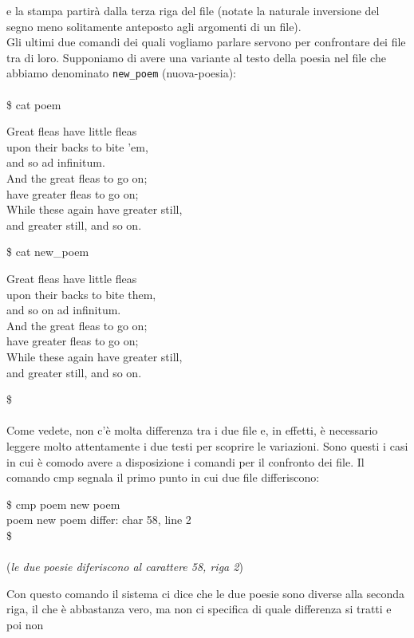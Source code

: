 e la stampa partirà dalla terza riga del file (notate la naturale inversione del segno meno solitamente anteposto agli argomenti di un file).\\
Gli ultimi due comandi dei quali vogliamo parlare servono per confrontare dei file tra di loro.  Supponiamo di avere una variante al testo della poesia nel file che abbiamo denominato {\tt new\_poem} (nuova-poesia):\\\\
\$ cat poem 
\begin{center}
	Great fleas have little fleas\\
	upon their backs to bite 'em,\\
	and so ad infinitum.\\
	And the great fleas to go on;\\
	have greater fleas to go on;\\
	While these again have greater still,\\
	and greater still, and so on.
\end{center}
\$ cat new\_poem
\begin{center}
	Great fleas have little fleas\\
	upon their backs to bite them,\\
	and so on ad infinitum.\\
	And the great fleas to go on;\\
	have greater fleas to go on;\\
	While these again have greater still,\\
	and greater still, and so on.
\end{center}
\$\\\\
Come vedete, non c'è molta differenza tra i due file e, in effetti, è necessario leggere
molto attentamente i due testi per scoprire le variazioni. Sono questi i casi in cui è comodo avere a disposizione i comandi per il confronto dei file. Il comando cmp segnala il primo punto in cui due file differiscono:
\begin{multicols}{2}
	\$ cmp poem new poem\\
	poem new poem differ: char 58, line 2\\
	\$\\\\
	({\it le due poesie diferiscono al carattere 58, riga 2})
\end{multicols}
Con questo comando il sistema ci dice che le due poesie sono diverse alla seconda riga, il che è abbastanza vero, ma non ci specifica di quale differenza si tratti e poi non
